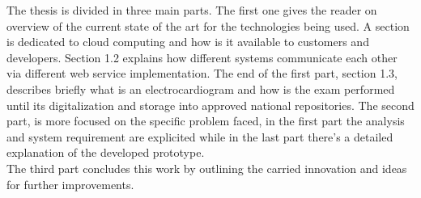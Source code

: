 The thesis is divided in three main parts. The first one gives the reader on overview of the current state of the art for the technologies being used. A section is dedicated to cloud computing and how is it available to customers and developers. Section 1.2 explains how different systems communicate each other via different web service implementation. The end of the first part, section 1.3, describes briefly what is an electrocardiogram and how is the exam performed until its digitalization and storage into approved national repositories. The second part, is more focused on the specific problem faced, in the first part the analysis and system requirement are explicited while in the last part there's a detailed explanation of the developed prototype.\\The third part concludes this work by outlining the carried innovation and ideas for further improvements.